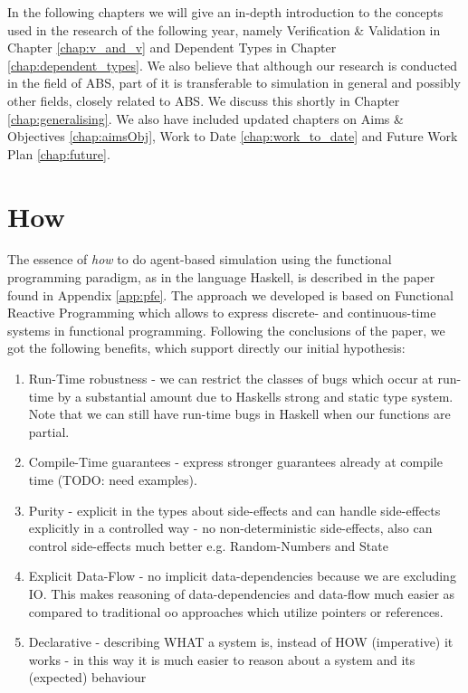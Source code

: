 In the following chapters we will give an in-depth introduction to the concepts used in the research of the following year, namely Verification \& Validation in Chapter \ref{chap:v_and_v} and Dependent Types in Chapter \ref{chap:dependent_types}. We also believe that although our research is conducted in the field of ABS, part of it is transferable to simulation in general and possibly other fields, closely related to ABS. We discuss this shortly in Chapter \ref{chap:generalising}. We also have included updated chapters on Aims \& Objectives \ref{chap:aimsObj}, Work to Date \ref{chap:work_to_date} and Future Work Plan \ref{chap:future}.

\section{How}
\label{sect:how}
The essence of \textit{how} to do agent-based simulation using the functional programming paradigm, as in the language Haskell, is described in the paper found in Appendix \ref{app:pfe}. The approach we developed is based on Functional Reactive Programming which allows to express discrete- and continuous-time systems in functional programming. Following the conclusions of the paper, we got the following benefits, which support directly our initial hypothesis:
\begin{enumerate}
	\item Run-Time robustness - we can restrict the classes of bugs which occur at run-time by a substantial amount due to Haskells strong and static type system. Note that we can still have run-time bugs in Haskell when our functions are partial.
	\item Compile-Time guarantees - express stronger guarantees already at compile time (TODO: need examples).
	\item Purity - explicit in the types about side-effects and can handle side-effects explicitly in a controlled way - no non-deterministic side-effects, also can control side-effects much better e.g. Random-Numbers and State
	\item Explicit Data-Flow - no implicit data-dependencies because we are excluding IO. This makes reasoning of data-dependencies and data-flow much easier as compared to traditional oo approaches which utilize pointers or references.
	\item Declarative - describing WHAT a system is, instead of HOW (imperative) it works - in this way it is much easier to reason about a system and its (expected) behaviour 
\end{enumerate}

